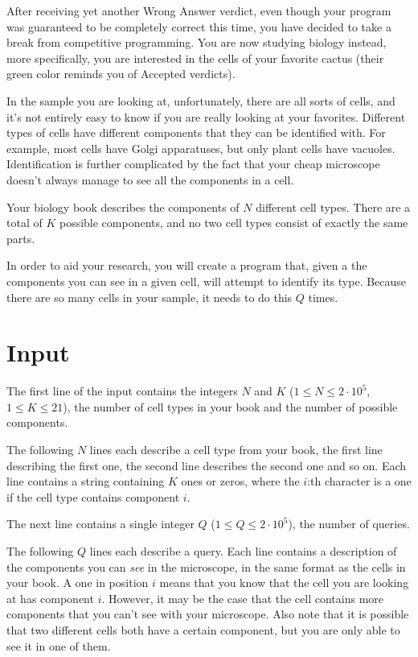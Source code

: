 \noindent
After receiving yet another Wrong Answer verdict, even though your program was guaranteed to be completely correct
this time, you have decided to take a break from competitive programming. You are now studying biology instead, more
specifically, you are interested in the cells of your favorite cactus (their green color reminds you of Accepted verdicts).

In the sample you are looking at, unfortunately, there are all sorts of cells, and it's not entirely easy to
know if you are really looking at your favorites. Different types of cells have different components that they
can be identified with. For example, most cells have Golgi apparatuses, but only plant cells have vacuoles.
Identification is further complicated by the fact that your cheap microscope doesn't always manage to see all the components in a cell.

Your biology book describes the components of $N$ different cell types. There are a total of $K$ possible
components, and no two cell types consist of exactly the same parts.

In order to aid your research, you will create a program that, given a the components you can see in a given cell,
will attempt to identify its type.
Because there are so many cells in your sample, it needs to do this $Q$ times.

\section*{Input}
The first line of the input contains the integers $N$ and $K$ ($1 \leq N \leq 2 \cdot 10^5$, $1 \leq K \leq 21$),
the number of cell types in your book and the number of possible components.

The following $N$ lines each describe a cell type from your book, the first line describing the first one, 
the second line describes the second one and so on. Each line contains a string containing $K$ ones or zeros,
where the $i$:th character is a one if the cell type contains component $i$.

The next line contains a single integer $Q$ ($1 \leq Q \leq 2\cdot 10^5$), the number of queries.

The following $Q$ lines each describe a query. Each line contains a description of the components you can \textit{see}
in the microscope, in the same format as the cells in your book. A one in position $i$ means that you know that the cell
you are looking at has component $i$. However, it may be the case that the cell contains more components that you can't
see with your microscope. Also note that it is possible that two different cells both have a certain component, but
you are only able to see it in one of them.

